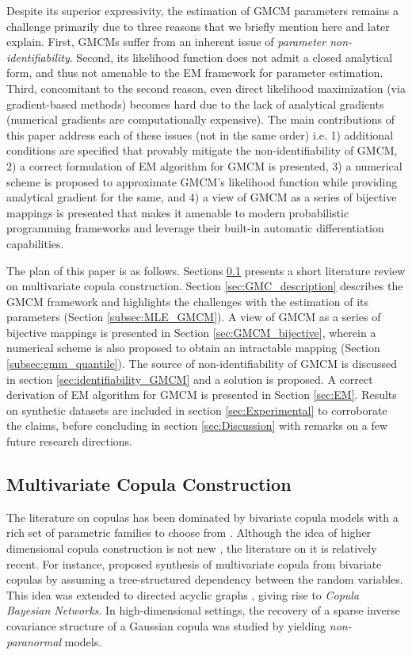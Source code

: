 \documentclass{article}
\theoremstyle{plain}
\theoremstyle{definition}
\theoremstyle{remark}
\begin{document}
Despite its superior expressivity, the estimation of GMCM parameters remains a challenge primarily due to three reasons that we briefly mention here and later explain. First, GMCMs suffer from an inherent issue of \emph{parameter non-identifiability}. Second, its likelihood function does not admit a closed analytical form, and thus not amenable to the EM framework for parameter estimation. Third, concomitant to the second reason, even direct likelihood maximization (via gradient-based methods) becomes hard due to the lack of analytical gradients (numerical gradients are computationally expensive). The main contributions of this paper address each of these issues (not in the same order) i.e. 1) additional conditions are specified that provably mitigate the non-identifiability of GMCM, 2) a correct formulation of EM algorithm for GMCM is presented, 3) a numerical scheme is proposed to approximate GMCM's likelihood function while providing analytical gradient for the same, and 4) a view of GMCM as a series of bijective mappings is presented that makes it amenable to modern probabilistic programming frameworks and leverage their built-in automatic differentiation capabilities.

The plan of this paper is as follows. Sections \ref{subsec:LitReview} presents a short literature review on multivariate copula construction. Section \ref{sec:GMC_description} describes the GMCM framework and highlights the challenges with the estimation of its parameters (Section \ref{subsec:MLE_GMCM}). A view of GMCM as a series of bijective mappings is presented in Section \ref{sec:GMCM_bijective}, wherein a numerical scheme is also proposed to obtain an intractable mapping (Section \ref{subsec:gmm_quantile}). The source of non-identifiability of GMCM is discussed in section \ref{sec:identifiability_GMCM} and a solution is proposed. A correct derivation of EM algorithm for GMCM is presented in Section \ref{sec:EM}. Results on synthetic datasets are included in section \ref{sec:Experimental} to corroborate the claims, before concluding in section \ref{sec:Discussion} with remarks on a few future research directions.

\subsection{Multivariate Copula Construction}\label{subsec:LitReview}
The literature on copulas has been dominated by bivariate copula models with a rich set of parametric families to choose from \citep{Nelsen1999introduction}. Although the idea of higher dimensional copula construction is not new \citep[see][]{Genest1995Multivariate, Joe1993Multivariate,Kojadinovic2010RpackageMVcopula}, the literature on it is relatively recent. For instance, \citet{Bedford2002,Kurowicka2009Book,Czado2010PairCopula} proposed  synthesis of multivariate copula from bivariate copulas by assuming a tree-structured dependency between the random variables. This idea was extended to directed acyclic graphs \citep[see][]{Elidan2010,Hanea2006CBN},  giving rise to \emph{Copula Bayesian Networks}. In high-dimensional settings, the recovery of a sparse inverse covariance structure of a Gaussian copula was studied by \citet{Liu2009} yielding  \emph{non-paranormal} models.
\end{document}
